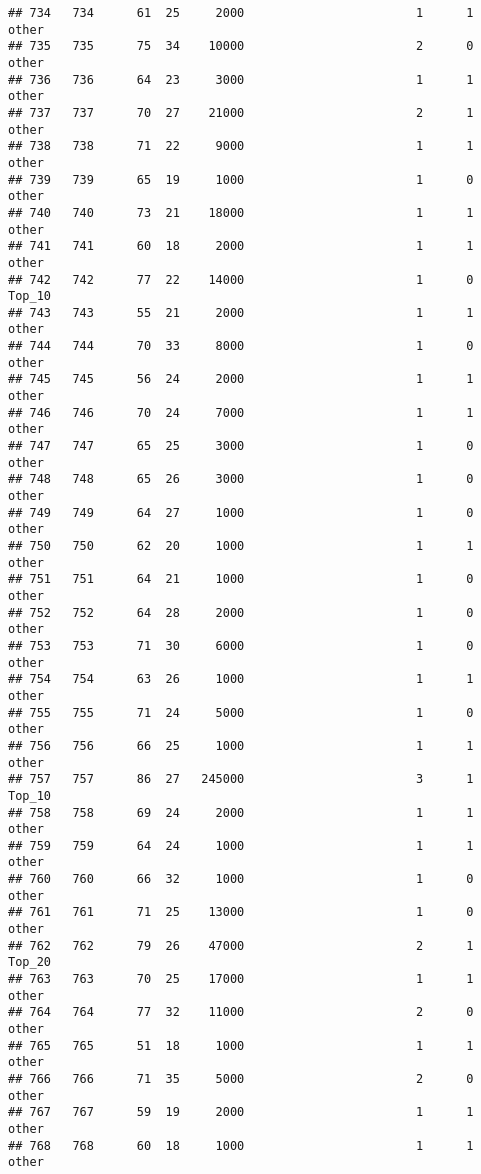 \documentclass[
]{article}
\begin{document}
\begin{verbatim}
## 734   734      61  25     2000                        1      1    other
## 735   735      75  34    10000                        2      0    other
## 736   736      64  23     3000                        1      1    other
## 737   737      70  27    21000                        2      1    other
## 738   738      71  22     9000                        1      1    other
## 739   739      65  19     1000                        1      0    other
## 740   740      73  21    18000                        1      1    other
## 741   741      60  18     2000                        1      1    other
## 742   742      77  22    14000                        1      0   Top_10
## 743   743      55  21     2000                        1      1    other
## 744   744      70  33     8000                        1      0    other
## 745   745      56  24     2000                        1      1    other
## 746   746      70  24     7000                        1      1    other
## 747   747      65  25     3000                        1      0    other
## 748   748      65  26     3000                        1      0    other
## 749   749      64  27     1000                        1      0    other
## 750   750      62  20     1000                        1      1    other
## 751   751      64  21     1000                        1      0    other
## 752   752      64  28     2000                        1      0    other
## 753   753      71  30     6000                        1      0    other
## 754   754      63  26     1000                        1      1    other
## 755   755      71  24     5000                        1      0    other
## 756   756      66  25     1000                        1      1    other
## 757   757      86  27   245000                        3      1   Top_10
## 758   758      69  24     2000                        1      1    other
## 759   759      64  24     1000                        1      1    other
## 760   760      66  32     1000                        1      0    other
## 761   761      71  25    13000                        1      0    other
## 762   762      79  26    47000                        2      1   Top_20
## 763   763      70  25    17000                        1      1    other
## 764   764      77  32    11000                        2      0    other
## 765   765      51  18     1000                        1      1    other
## 766   766      71  35     5000                        2      0    other
## 767   767      59  19     2000                        1      1    other
## 768   768      60  18     1000                        1      1    other

\end{verbatim}
\end{document}
